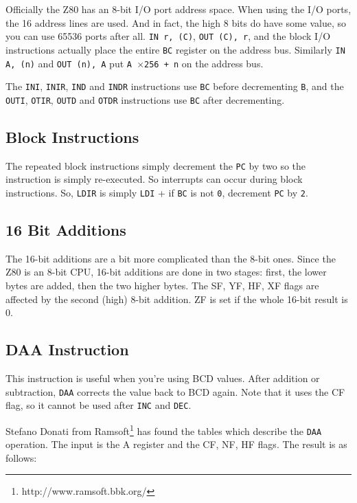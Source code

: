 Officially the Z80 has an 8-bit I/O port address space. When using the I/O ports, the 16 address lines are used. And in fact, the high 8 bits do have some value, so you can use 65536 ports after all. {\tt IN r, (C)}, {\tt OUT (C), r}, and the block I/O instructions actually place the entire {\tt BC} register on the address bus. Similarly {\tt IN A, (n)} and {\tt OUT (n), A} put {\tt A $\times$256 + n} on the address bus.

The {\tt INI}, {\tt INIR}, {\tt IND} and {\tt INDR} instructions use {\tt BC} before decrementing {\tt B}, and the {\tt OUTI}, {\tt OTIR}, {\tt OUTD} and {\tt OTDR} instructions use {\tt BC} after decrementing.


\subsection{Block Instructions}

The repeated block instructions simply decrement the {\tt PC} by two so the instruction is simply re-executed. So interrupts can occur during block instructions. So, {\tt LDIR} is simply {\tt LDI} + if {\tt BC} is not {\tt 0}, decrement {\tt PC} by {\tt 2}.


\subsection{16 Bit Additions}

The 16-bit additions are a bit more complicated than the 8-bit ones. Since the Z80 is an 8-bit CPU, 16-bit additions are done in two stages: first, the lower bytes are added, then the two higher bytes. The SF, YF, HF, XF flags are affected by the second (high) 8-bit addition. ZF is set if the whole 16-bit result is 0.


\subsection{DAA Instruction}
\label{daa}

This instruction is useful when you're using BCD values. After addition or subtraction, {\tt DAA} corrects the value back to BCD again.  Note that it uses the CF flag, so it cannot be used after {\tt INC} and {\tt DEC}.

Stefano Donati from Ramsoft\footnote{http://www.ramsoft.bbk.org/} has found the tables which describe the {\tt DAA} operation. The input is the A register and the CF, NF, HF flags. The result is as follows:

